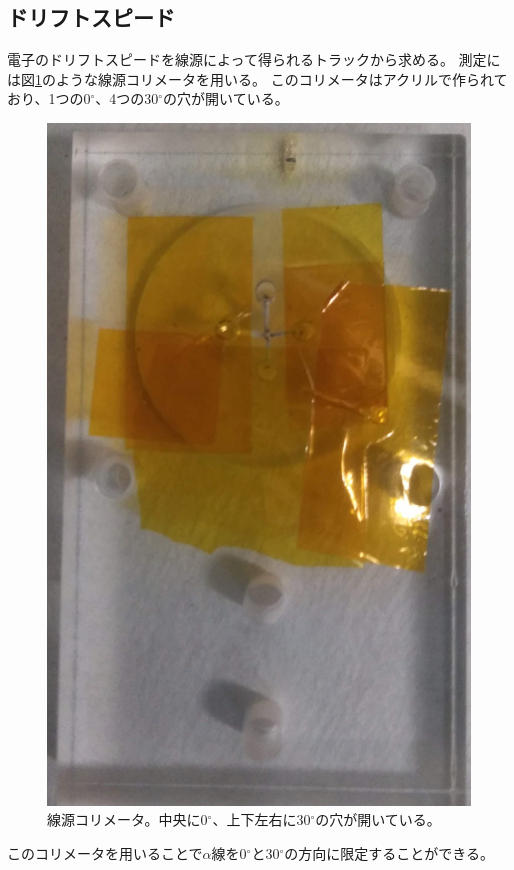 \subsection{ドリフトスピード}
電子のドリフトスピードを線源によって得られるトラックから求める。
測定には図\ref{pic::collimator}のような線源コリメータを用いる。
このコリメータはアクリルで作られており、1つの0${}^{\circ}$、4つの30${}^{\circ}$の穴が開いている。
\begin{figure}
  \centering
  \includegraphics[clip, height=0.7\columnwidth, angle=90]{pic/IMG_20191023_145443_trmd.jpg}
  \caption[線源コリメータ。]
          {線源コリメータ。中央に0${}^{\circ}$、上下左右に30${}^{\circ}$の穴が開いている。}
  \label{pic::collimator}  
\end{figure}
このコリメータを用いることで$\alpha$線を0${}^{\circ}$と30${}^{\circ}$の方向に限定することができる。

